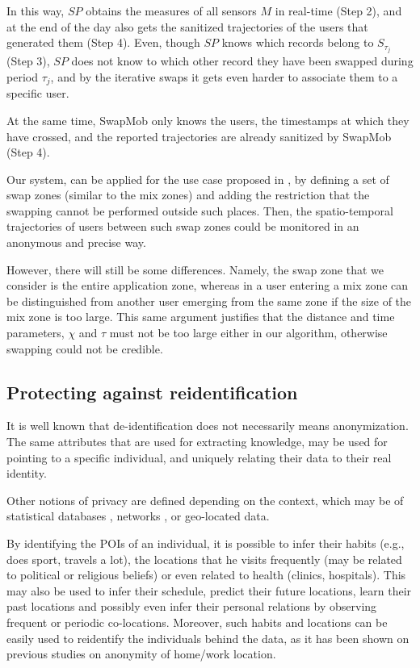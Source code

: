 In this way, $SP$ obtains the measures of all sensors $M$ in real-time (Step 2), and at the end of the day also gets the sanitized trajectories of the users that generated them (Step 4).
Even, though $SP$ knows which records belong to $S_{\tau_j}$ (Step 3), $SP$ does not know to which other record they have been swapped during period $\tau_j$, and by the iterative swaps it gets even harder to associate them to a specific user.

At the same time, SwapMob only knows the users, the timestamps at which they have crossed, and the reported trajectories are already sanitized by SwapMob (Step 4).

Our system, can be applied for the use case proposed in \cite{Beresford2003}, by defining a set of swap zones (similar to the mix zones) and adding the restriction that the swapping cannot be performed outside such places. Then, the spatio-temporal trajectories of users between such swap zones could be monitored in an anonymous and precise way.


However, there will still be some differences. Namely, the swap zone that we consider is the entire application zone, whereas in \cite{Beresford2003} a user entering a mix zone can be distinguished from another user emerging from the same zone if the size of the mix zone is too large.  
This same argument justifies that the distance and time parameters, $\chi$ and $\tau$ must not be too large either in our algorithm, otherwise swapping could not be credible.



\subsection{Protecting against reidentification} %
It is well known that de-identification does not necessarily means anonymization. The same attributes that are used for extracting knowledge, may be used for pointing to a specific individual, and uniquely relating their data to their real identity.

Other notions of privacy are defined depending on the context, which may be of statistical databases \citep{Danezis15}, networks \citep{Zhou:2008}, or geo-located data.

By identifying the POIs of an individual, it is possible to infer their habits (e.g., does sport, travels a lot), the locations that he visits frequently (may be related to political or religious beliefs) or even related to health (clinics, hospitals). This may also be used to infer their schedule, predict their future locations, learn their past locations and possibly even infer their personal relations by observing frequent or periodic co-locations.
Moreover, such habits and locations can be easily used to reidentify the individuals behind the data, as it has been shown on previous studies on anonymity of home/work location.

